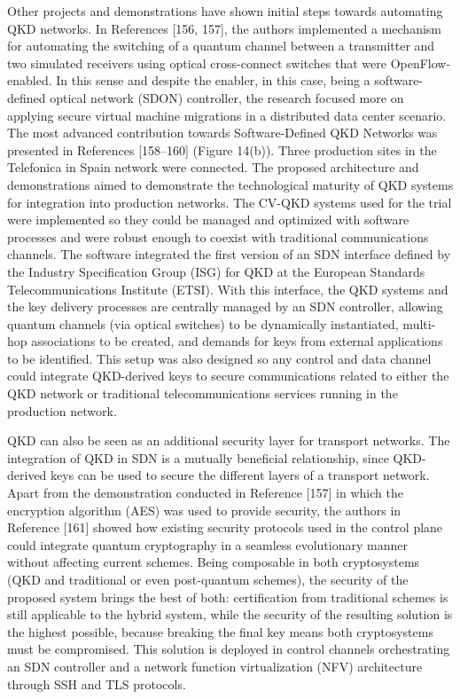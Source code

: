 Other projects and demonstrations have shown initial steps towards automating QKD networks.
In References [156, 157], the authors implemented a mechanism for automating the switching of a quantum channel between a transmitter and two simulated receivers using optical cross-connect switches that were OpenFlow-enabled. In this sense and despite the enabler, in this case, being a software-defined optical network (SDON) controller, the research focused more on applying secure virtual machine migrations in a distributed data center scenario.
The most advanced contribution towards Software-Defined QKD Networks was presented in References [158–160] (Figure 14(b)). Three production sites in the Telefonica in Spain network were connected. The proposed architecture and demonstrations aimed to demonstrate the technological maturity of QKD systems for integration into production networks. The CV-QKD systems used for the trial were implemented so they could be managed and optimized with software processes and were robust enough to coexist with traditional communications channels. The software integrated the first version of an SDN interface defined by the Industry Specification Group (ISG) for QKD at the European Standards Telecommunications Institute (ETSI). With this interface, the QKD systems and the key delivery processes are centrally managed by an SDN controller, allowing quantum channels (via optical switches) to be dynamically instantiated, multi-hop associations to be created, and demands for keys from external applications to be identified. This setup was also designed so any control and data channel could integrate QKD-derived keys to secure communications related to either the QKD network or traditional telecommunications services running in the production network.

QKD can also be seen as an additional security layer for transport networks. The integration of QKD in SDN is a mutually beneficial relationship, since QKD-derived keys can be used to secure the different layers of a transport network. Apart from the demonstration conducted in Reference [157] in which the encryption algorithm (AES) was used to provide security, the authors in Reference [161] showed how existing security protocols used in the control plane could integrate quantum cryptography in a seamless evolutionary manner without affecting current schemes. Being composable in both cryptosystems (QKD and traditional or even post-quantum schemes), the security of the proposed system brings the best of both: certification from traditional schemes is still applicable to the hybrid system, while the security of the resulting solution is the highest possible, because breaking the final key means both cryptosystems must be compromised. This solution is deployed in control channels orchestrating an SDN controller and a network function virtualization (NFV) architecture through SSH and TLS protocols.

